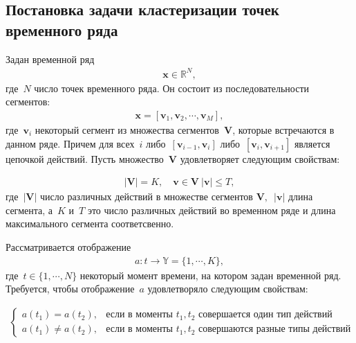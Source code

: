\subsection{Постановка задачи кластеризации точек временного ряда}

Задан временной ряд
\begin{equation}
\label{eq:st:1}
\begin{aligned}
\textbf{x} \in \mathbb{R}^{N},
\end{aligned}
\end{equation}
где~$N$ число точек временного ряда. Он состоит из последовательности сегментов:
\begin{equation}
\label{eq:st:2}
\begin{aligned}
\textbf{x} = [\textbf{v}_1, \textbf{v}_2, \cdots, \textbf{v}_M],
\end{aligned}
\end{equation}
где~$\textbf{v}_i$ некоторый сегмент из множества сегментов~$\mathbf{V}$, которые встречаются в данном ряде. 
Причем для всех~$i$ либо~$[\textbf{v}_{i-1},\textbf{v}_{i}]$ либо~$[\textbf{v}_{i},\textbf{v}_{i+1}]$  является цепочкой действий. Пусть множество~$\mathbf{V}$ удовлетворяет следующим свойствам:

\begin{equation}
\label{eq:st:3}
\begin{aligned}
\left|\mathbf{V}\right| = K, \quad \textbf{v} \in \mathbf{V}~\left|\textbf{v}\right| \leq T,
\end{aligned}
\end{equation}
где~$\left|\mathbf{V}\right|$ число различных действий в множестве сегментов $\mathbf{V},$~$\left|\textbf{v}\right|$ длина сегмента, а~$K$ и~$T$ это число различных действий во временном ряде и длина максимального сегмента соответсвенно.

Рассматривается отображение
\begin{equation}
\label{eq:st:4}
\begin{aligned}
a : t \to \mathbb{Y} = \{1,\cdots, K\}, 
\end{aligned}
\end{equation}
где~$t \in \{1,\cdots, N\}$ некоторый момент времени, на котором задан временной ряд.
Требуется, чтобы отображение~$a$ удовлетворяло следующим свойствам:

\begin{equation}
\label{eq:st:5}
\begin{aligned}
\begin{cases}
    a\left(t_1\right) = a\left(t_2\right), &  \text{если в моменты } t_1, t_2 \text{ совершается один тип действий}\\
    a\left(t_1\right) \not= a\left(t_2\right), &  \text{если в моменты } t_1, t_2 \text{ совершаются разные типы действий }
\end{cases}
\end{aligned}
\end{equation}

